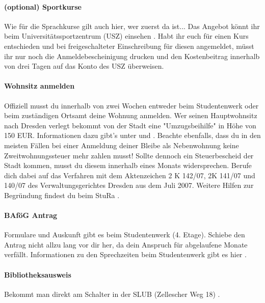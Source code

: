 \paragraph{(optional) Sportkurse}
Wie für die Sprachkurse gilt auch hier, wer zuerst da ist...
Das Angebot könnt ihr beim Universitätssportzentrum (USZ) einsehen \link{\textcolor{red}{NONE}}.
Habt ihr euch für einen Kurs entschieden und bei freigeschalteter Einschreibung für diesen angemeldet, müsst ihr nur noch die Anmeldebescheinigung drucken und den Kostenbeitrag innerhalb von drei Tagen auf das Konto des USZ überweisen.


\paragraph{Wohnsitz anmelden}
Offiziell musst du innerhalb von zwei Wochen entweder beim Studentenwerk oder beim zuständigen Ortsamt \link{\textcolor{red}{NONE}} deine Wohnung anmelden.
Wer seinen Hauptwohnsitz nach Dresden verlegt bekommt von der Stadt eine "Umzugsbeihilfe" in Höhe von 150 EUR.
Informationen dazu gibt's unter \link{\textcolor{red}{NONE}} und \link{\textcolor{red}{NONE}}.
Beachte ebenfalls, dass du in den meisten Fällen bei einer Anmeldung deiner Bleibe als Nebenwohnung keine Zweitwohnungssteuer mehr zahlen musst!
Sollte dennoch ein Steuerbescheid der Stadt kommen, musst du diesem innerhalb eines Monats widersprechen.
Berufe dich dabei auf das Verfahren mit dem Aktenzeichen 2 K 142/07, 2K 141/07 und 140/07 des Verwaltungsgerichtes Dresden aus dem Juli 2007.
Weitere Hilfen zur Begründung findest du beim StuRa \link{\textcolor{red}{NONE}}.

\paragraph{BAföG Antrag}
Formulare und Auskunft gibt es beim Studentenwerk (4. Etage).
Schiebe den Antrag nicht allzu lang vor dir her, da dein Anspruch für abgelaufene Monate verfällt.
Informationen zu den Sprechzeiten beim Studentenwerk gibt es hier \link{\textcolor{red}{NONE}}.

\paragraph{Bibliotheksausweis}
Bekommt man direkt am Schalter in der SLUB (Zellescher Weg 18) \link{\textcolor{red}{NONE}}.


